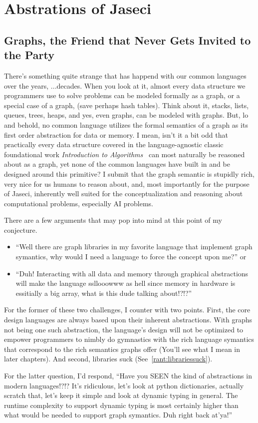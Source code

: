 \chapter{Abstrations of Jaseci}
\section{Graphs, the Friend that Never Gets Invited to the Party}
There's something quite strange that has happend with our \gls{common languages} over the years, ...decades. When you look at it, almost every data structure we programmers use to solve problems can be modeled formally as a graph, or a special case of a graph, (save perhaps hash tables). Think about it, stacks, lists, queues, trees, heaps, and yes, even graphs, can be modeled with graphs. But, lo and behold, no common language utilizes the formal semantics of a graph as its first order abstraction for data or memory. I mean, isn't it a bit odd that practically every data structure covered in the language-agnostic classic foundational work \textit{Introduction to Algorithms}~\cite{intro_to_algo} can most naturally be reasoned about as a graph, yet none of the common languages have built in and be designed around this primitive? I submit that the graph semantic is stupidly rich, very nice for us humans to reason about, and, most importantly for the purpose of Jaseci, inherently well suited for the conceptualization and reasoning about computational problems, especially AI problems.
\par
There are a few arguments that may pop into mind at this point of my conjecture.
\begin{itemize}
    \item ``Well there are graph libraries in my favorite language that implement graph symantics, why would I need a language to force the concept upon me?''
          or
    \item ``Duh! Interacting with all data and memory through graphical abstractions will make the language ssllooowww as hell since memory in hardware is essitially a big array, what is this dude talking about!?!?''
\end{itemize}
\par
For the former of these two challenges, I counter with two points. First, the core design languages are always based upon their inherent abstractions. With graphs not being one such abstraction, the language's design will not be optimized to empower programmers to nimbly do gymnastics with the rich language symantics that correspond to the rich semantics graphs offer (You'll see what I mean in later chapters). And second, libraries suck (See~\ref{rant:librariessuck}).
\par
For the latter question, I'd respond, ``Have you SEEN the kind of abstractions in modern languages!?!? It's ridiculous, let's look at python dictionaries, actually scratch that, let's keep it simple and look at dynamic typing in general. The runtime complexity to support dynamic typing is most certainly higher than what would be needed to support graph symantics. Duh right back at'ya!''
